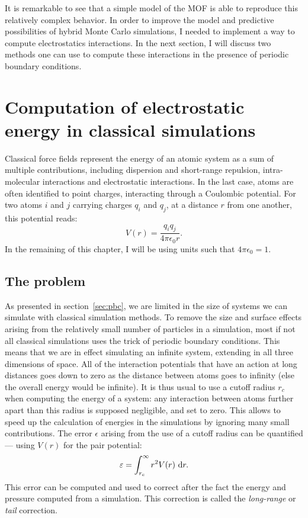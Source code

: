 \documentclass[thesis]{subfiles}
\begin{document}
It is remarkable to see that a simple model of the MOF is able to reproduce this
relatively complex behavior. In order to improve the model and predictive
possibilities of hybrid Monte Carlo simulations, I needed to implement a way to
compute electrostatics interactions. In the next section, I will discuss two
methods one can use to compute these interactions in the presence of periodic
boundary conditions.

\section{Computation of electrostatic energy in classical simulations}
\label{sec:electrostatic}

Classical force fields represent the energy of an atomic system as a sum of
multiple contributions, including dispersion and short-range repulsion,
intra-molecular interactions and electrostatic interactions. In the last case,
atoms are often identified to point charges, interacting through a Coulombic
potential. For two atoms $i$ and $j$ carrying charges $q_i$ and $q_j$, at a
distance $r$ from one another, this potential reads:
\[ V(r) = \frac{q_i q_j}{4 \pi \epsilon_0 r}.\]
In the remaining of this chapter, I will be using units such that $4 \pi
\epsilon_0 = 1$.

\subsection{The problem}

As presented in section~\ref{sec:pbc}, we are limited in the size of systems we
can simulate with classical simulation methods. To remove the size and surface
effects arising from the relatively small number of particles in a simulation,
most if not all classical simulations uses the trick of periodic boundary
conditions. This means that we are in effect simulating an infinite system,
extending in all three dimensions of space. All of the interaction potentials
that have an action at long distances goes down to zero as the distance between
atoms goes to infinity (else the overall energy would be infinite). It is thus
usual to use a cutoff radius $r_c$ when computing the energy of a system: any
interaction between atoms further apart than this radius is supposed negligible,
and set to zero. This allows to speed up the calculation of energies in the
simulations by ignoring many small contributions. The error $\epsilon$ arising
from the use of a cutoff radius can be quantified --- using $V(r)$ for the pair
potential:
\[\varepsilon = \int_{r_c}^\infty r^2 V(r)\ \text{d} r. \]
This error can be computed and used to correct after the fact the energy and
pressure computed from a simulation. This correction is called the
\emph{long-range} or \emph{tail} correction.
\end{document}
